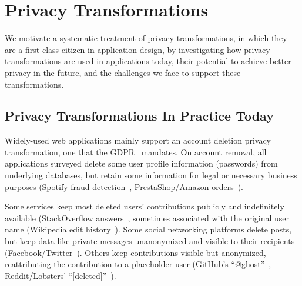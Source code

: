 \section{Privacy Transformations}
\label{sec:survey}

We motivate a systematic treatment of privacy transformations, in which they are a first-class citizen in
application design, by investigating how privacy transformations are used in applications today,
their potential to achieve better privacy in the future, and the challenges we face to support these
transformations.

\subsection{Privacy Transformations In Practice Today}
%
%
Widely-used web applications mainly support an account deletion privacy transformation,
one that \eg the GDPR~\cite[Art.\ 17]{eu:gdpr} mandates.
%
On account removal, all applications surveyed delete some user profile
information (\eg passwords) from underlying databases, but 
retain some information for legal or necessary business purposes
(\eg Spotify fraud detection~\cite{spotify:privacy}, PrestaShop/Amazon
orders~\cite{amazon:privacy, prestashop:privacy}).
%

Some services keep most deleted users' contributions publicly and indefinitely available (\eg StackOverflow
answers~\cite{stackoverflow:privacy}, sometimes
associated with the original user name (\eg Wikipedia edit history~\cite{wikipedia:privacy}).
%
Some social networking platforms delete posts, but keep data like private messages unanonymized and visible to their recipients (Facebook/Twitter~\cite{facebook:privacy, twitter:privacy}).
%
Others keep contributions visible but anonymized, reattributing the contribution to a placeholder user
(\eg GitHub's ``@ghost''~\cite{github:privacy}, Reddit/Lobsters'
``[deleted]''~\cite{reddit:privacy, lobsters:privacy}).
%
%

